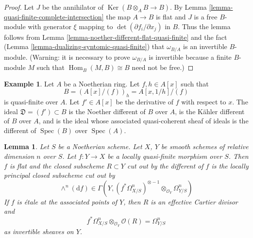 \documentclass{stacks-project}
\theoremstyle{plain}
\newtheorem{lemma}[subsection]{Lemma}
\theoremstyle{definition}
\newtheorem{example}[subsection]{Example}
\theoremstyle{remark}
\numberwithin{equation}{subsection}
\def\Spec{\mathop{\mathrm{Spec}}}
\def\Hom{\mathop{\mathrm{Hom}}\nolimits}
\def\Ker{\mathop{\mathrm{Ker}}}
\begin{document}
\begin{proof}
Let $J$ be the annihilator of $\Ker(B \otimes_A B \to B)$.
By Lemma \ref{lemma-quasi-finite-complete-intersection}
the map $A \to B$ is flat and
$J$ is a free $B$-module with generator $\xi$ mapping to
$\det(\partial f_i/\partial x_j)$ in $B$.
Thus the lemma follows from
Lemma \ref{lemma-noether-different-flat-quasi-finite}
and the fact (Lemma \ref{lemma-dualizing-syntomic-quasi-finite})
that $\omega_{B/A}$ is an invertible $B$-module.
(Warning: it is necessary to prove $\omega_{B/A}$
is invertible because a finite $B$-module $M$ such
that $\Hom_B(M, B) \cong B$ need not be free.)
\end{proof}

\begin{example}
\label{example-different-for-monogenic}
Let $A$ be a Noetherian ring. Let $f, h \in A[x]$ such that
$$
B = (A[x]/(f))_h = A[x, 1/h]/(f)
$$
is quasi-finite over $A$. Let $f' \in A[x]$ be the derivative
of $f$ with respect to $x$. The ideal $\mathfrak{D} = (f') \subset B$
is the Noether different of $B$ over $A$,
is the K\"ahler different of $B$ over $A$, and
is the ideal whose associated quasi-coherent sheaf of ideals is the
different of $\Spec(B)$ over $\Spec(A)$.
\end{example}

\begin{lemma}
\label{lemma-discriminant-quasi-finite-morphism-smooth}
Let $S$ be a Noetherian scheme. Let $X$, $Y$ be smooth schemes
of relative dimension $n$ over $S$. Let $f : Y \to X$ be a
locally quasi-finite morphism over $S$.
Then $f$ is flat and the closed subscheme $R \subset Y$
cut out by the different of $f$ is the locally principal
closed subscheme cut out by
$$
\wedge^n(\text{d}f) \in
\Gamma(Y,
(f^*\Omega^n_{X/S})^{\otimes -1} \otimes_{\mathcal{O}_Y} \Omega^n_{Y/S})
$$
If $f$ is \'etale at the associated points of $Y$, then $R$ is an
effective Cartier divisor and
$$
f^*\Omega^n_{X/S} \otimes_{\mathcal{O}_Y} \mathcal{O}(R) =
\Omega^n_{Y/S}
$$
as invertible sheaves on $Y$.
\end{lemma}
\end{document}
